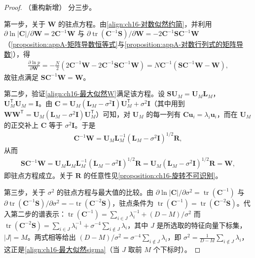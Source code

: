 \documentclass[../../main.tex]{subfiles}
\begin{document}
\begin{proof}（重构新增）
分三步。

第一步，关于 $\bm{W}$ 的驻点方程。由\eqref{align:ch16-对数似然约简}，并利用 $\partial\ln|\bm{C}|/\partial\bm{W}=2\bm{C}^{-1}\bm{W}$ 与 $\partial\operatorname{tr}(\bm{C}^{-1}\bm{S})/\partial\bm{W}=-2\bm{C}^{-1}\bm{S}\bm{C}^{-1}\bm{W}$（\cref{proposition:appA-矩阵导数恒等式}与\cref{proposition:appA-对数行列式的矩阵导数}），得
\begin{align*}
  \frac{\partial\ln p}{\partial\bm{W}}=-\frac{N}{2}\left(2\bm{C}^{-1}\bm{W}-2\bm{C}^{-1}\bm{S}\bm{C}^{-1}\bm{W}\right)=N\bm{C}^{-1}\left(\bm{S}\bm{C}^{-1}\bm{W}-\bm{W}\right),
\end{align*}
故驻点满足 $\bm{S}\bm{C}^{-1}\bm{W}=\bm{W}$。

第二步，验证\eqref{align:ch16-最大似然W}满足该方程。设 $\bm{S}\bm{U}_M=\bm{U}_M\bm{L}_M$，$\bm{U}_M^{\mathsf T}\bm{U}_M=\bm{I}$。由 $\bm{C}=\bm{U}_M(\bm{L}_M-\sigma^2\bm{I})\bm{U}_M^{\mathsf T}+\sigma^2\bm{I}$（其中用到 $\bm{W}\bm{W}^{\mathsf T}=\bm{U}_M(\bm{L}_M-\sigma^2\bm{I})\bm{U}_M^{\mathsf T}$）可知，对 $\bm{U}_M$ 的每一列有 $\bm{C}\bm{u}_i=\lambda_i\bm{u}_i$，而在 $\bm{U}_M$ 的正交补上 $\bm{C}$ 等于 $\sigma^2\bm{I}$。于是
\begin{align*}
  \bm{C}^{-1}\bm{W}=\bm{U}_M\bm{L}_M^{-1}\left(\bm{L}_M-\sigma^2\bm{I}\right)^{1/2}\bm{R},
\end{align*}
从而
\begin{align*}
  \bm{S}\bm{C}^{-1}\bm{W}=\bm{U}_M\bm{L}_M\bm{L}_M^{-1}\left(\bm{L}_M-\sigma^2\bm{I}\right)^{1/2}\bm{R}=\bm{U}_M\left(\bm{L}_M-\sigma^2\bm{I}\right)^{1/2}\bm{R}=\bm{W},
\end{align*}
即驻点方程成立。关于 $\bm{R}$ 的任意性见\cref{proposition:ch16-旋转不可识别}。

第三步，关于 $\sigma^2$ 的驻点方程与最大值的比较。由 $\partial\ln|\bm{C}|/\partial\sigma^2=\operatorname{tr}(\bm{C}^{-1})$ 与 $\partial\operatorname{tr}(\bm{C}^{-1}\bm{S})/\partial\sigma^2=-\operatorname{tr}(\bm{C}^{-2}\bm{S})$，驻点条件为 $\operatorname{tr}(\bm{C}^{-1})=\operatorname{tr}(\bm{C}^{-2}\bm{S})$。代入第二步的谱表示：$\operatorname{tr}(\bm{C}^{-1})=\sum_{i\in J}\lambda_i^{-1}+(D-M)/\sigma^2$ 而 $\operatorname{tr}(\bm{C}^{-2}\bm{S})=\sum_{i\in J}\lambda_i^{-1}+\sigma^{-4}\sum_{i\notin J}\lambda_i$，其中 $J$ 是所选取的特征向量下标集，$|J|=M$。两式相等给出 $(D-M)/\sigma^2=\sigma^{-4}\sum_{i\notin J}\lambda_i$，即 $\sigma^2=\frac{1}{D-M}\sum_{i\notin J}\lambda_i$，这正是\eqref{align:ch16-最大似然sigma}（当 $J$ 取前 $M$ 个下标时）。


\end{proof}
\end{document}
